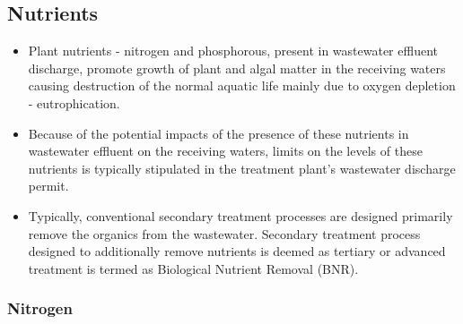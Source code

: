 \subsection{Nutrients}	
			\begin{itemize}
				\item Plant nutrients - nitrogen and phosphorous, present in wastewater effluent discharge, promote growth of plant and algal matter in the receiving waters causing destruction of the normal aquatic life mainly due to oxygen depletion - eutrophication.
				      
				\item Because of the potential impacts of the presence of these nutrients in wastewater effluent on the receiving waters,  limits on the levels of these nutrients is typically stipulated in the treatment plant's wastewater discharge permit.
				      
				\item Typically, conventional secondary treatment processes are designed primarily remove the organics from the wastewater.  Secondary treatment process designed to additionally remove nutrients is deemed as tertiary or advanced treatment is termed as Biological Nutrient Removal (BNR).
			\end{itemize}
	\subsubsection{Nitrogen}				

